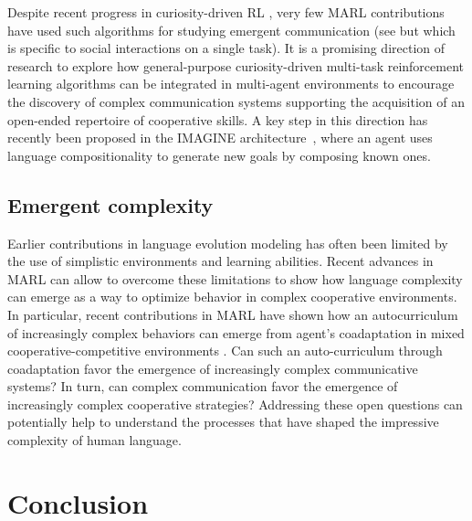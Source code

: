 \documentclass[letterpaper]{article} %
\begin{document}
Despite recent progress in curiosity-driven RL \cite{pathak2017curiosity,colas2018curious}, very few MARL contributions have used such algorithms for studying emergent communication (see \cite{anonymous2019intrinsic} but which is specific to social interactions on a single task). It is a promising direction of research to explore how general-purpose curiosity-driven multi-task reinforcement learning algorithms \cite{colas2018curious} can be integrated in multi-agent environments to encourage the discovery of complex communication systems supporting the acquisition of an open-ended repertoire of cooperative skills. A key step in this direction has recently been proposed in the IMAGINE architecture~\cite{colas2020LanguageCognitiveTool}, where an agent uses language compositionality to generate new goals by composing known ones.


\subsection{Emergent complexity}
Earlier contributions in language evolution modeling has often been limited by the use of simplistic environments and learning abilities. Recent advances in MARL can allow to overcome these limitations to show how language complexity can emerge as a way to optimize behavior in complex cooperative environments. In particular, recent contributions in MARL have shown how an autocurriculum of increasingly complex behaviors can emerge from agent's coadaptation in mixed cooperative-competitive environments \cite{bansal2018emergent,Baker2019}. Can such an auto-curriculum through coadaptation favor the emergence of increasingly complex communicative systems? In turn, can complex communication favor the emergence of increasingly complex cooperative strategies? Addressing these open questions can potentially help to understand the processes that have shaped the impressive complexity of human language.

\section{Conclusion}
\end{document}
